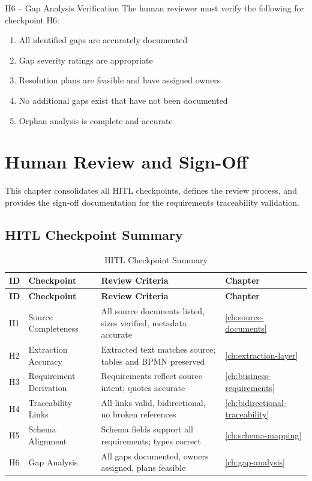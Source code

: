 \documentclass[11pt,a4paper,twoside]{report}
\begin{document}
\begin{hitlbox}{H6 -- Gap Analysis Verification}
The human reviewer must verify the following for checkpoint H6:
\begin{enumerate}[noitemsep]
\item All identified gaps are accurately documented
\item Gap severity ratings are appropriate
\item Resolution plans are feasible and have assigned owners
\item No additional gaps exist that have not been documented
\item Orphan analysis is complete and accurate
\end{enumerate}
\end{hitlbox}
\chapter{Human Review and Sign-Off}
\label{ch:human-review-signoff}

This chapter consolidates all HITL checkpoints, defines the review process,
and provides the sign-off documentation for the requirements traceability
validation.

\section{HITL Checkpoint Summary}
\label{sec:checkpoint-summary}

\begin{longtable}{@{}C{1cm}L{3.5cm}L{6cm}C{2cm}@{}}
\caption{HITL Checkpoint Summary}
\label{tab:checkpoint-summary} \\
\toprule
\textbf{ID} & \textbf{Checkpoint} & \textbf{Review Criteria} & \textbf{Chapter} \\
\midrule
\endfirsthead
\toprule
\textbf{ID} & \textbf{Checkpoint} & \textbf{Review Criteria} & \textbf{Chapter} \\
\midrule
\endhead
H1 & Source Completeness & All source documents listed, sizes verified, metadata accurate & \cref{ch:source-documents} \\
H2 & Extraction Accuracy & Extracted text matches source; tables and BPMN preserved & \cref{ch:extraction-layer} \\
H3 & Requirement Derivation & Requirements reflect source intent; quotes accurate & \cref{ch:business-requirements} \\
H4 & Traceability Links & All links valid, bidirectional, no broken references & \cref{ch:bidirectional-traceability} \\
H5 & Schema Alignment & Schema fields support all requirements; types correct & \cref{ch:schema-mapping} \\
H6 & Gap Analysis & All gaps documented, owners assigned, plans feasible & \cref{ch:gap-analysis} \\
\bottomrule
\end{longtable}
\end{document}
